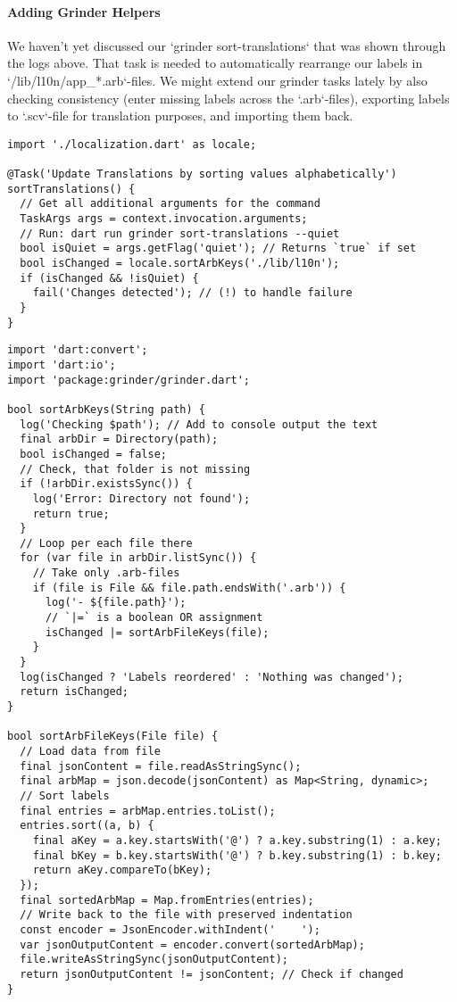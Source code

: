 \paragraph{Adding Grinder Helpers}

We haven't yet discussed our `grinder sort-translations` that was shown through the logs above. That task is needed
to automatically rearrange our labels in `/lib/l10n/app\_*.arb`-files. We might extend our grinder tasks lately
by also checking consistency (enter missing labels across the `.arb`-files), exporting labels to `.scv`-file
for translation purposes, and importing them back.

\begin{lstlisting}
import './localization.dart' as locale;

@Task('Update Translations by sorting values alphabetically')
sortTranslations() {
  // Get all additional arguments for the command
  TaskArgs args = context.invocation.arguments;
  // Run: dart run grinder sort-translations --quiet
  bool isQuiet = args.getFlag('quiet'); // Returns `true` if set
  bool isChanged = locale.sortArbKeys('./lib/l10n');
  if (isChanged && !isQuiet) {
    fail('Changes detected'); // (!) to handle failure
  }
}
\end{lstlisting}

\begin{lstlisting}
import 'dart:convert';
import 'dart:io';
import 'package:grinder/grinder.dart';

bool sortArbKeys(String path) {
  log('Checking $path'); // Add to console output the text
  final arbDir = Directory(path);
  bool isChanged = false;
  // Check, that folder is not missing
  if (!arbDir.existsSync()) {
    log('Error: Directory not found');
    return true;
  }
  // Loop per each file there
  for (var file in arbDir.listSync()) {
    // Take only .arb-files
    if (file is File && file.path.endsWith('.arb')) {
      log('- ${file.path}');
      // `|=` is a boolean OR assignment
      isChanged |= sortArbFileKeys(file);
    }
  }
  log(isChanged ? 'Labels reordered' : 'Nothing was changed');
  return isChanged;
}

bool sortArbFileKeys(File file) {
  // Load data from file
  final jsonContent = file.readAsStringSync();
  final arbMap = json.decode(jsonContent) as Map<String, dynamic>;
  // Sort labels
  final entries = arbMap.entries.toList();
  entries.sort((a, b) {
    final aKey = a.key.startsWith('@') ? a.key.substring(1) : a.key;
    final bKey = b.key.startsWith('@') ? b.key.substring(1) : b.key;
    return aKey.compareTo(bKey);
  });
  final sortedArbMap = Map.fromEntries(entries);
  // Write back to the file with preserved indentation
  const encoder = JsonEncoder.withIndent('    ');
  var jsonOutputContent = encoder.convert(sortedArbMap);
  file.writeAsStringSync(jsonOutputContent);
  return jsonOutputContent != jsonContent; // Check if changed
}
\end{lstlisting}


